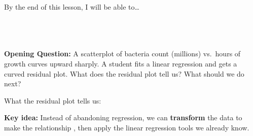 \documentclass[10pt]{article}
\begin{document}
\namedateperiod

\vspace{0.12in}

\begin{objectivebox}
\small By the end of this lesson, I will be able to\dots\\[4pt]
\writeline\\[1pt]
\writeline\\[1pt]
\writeline\\[1pt]
\writeline
\end{objectivebox}

\vspace{0.1in}

\begin{vocabbox}
\end{vocabbox}

\vspace{0.1in}

\begin{hookbox}
\small\textbf{Opening Question:} A scatterplot of bacteria count (millions) vs.\ hours of
growth curves upward sharply. A student fits a linear regression and gets a curved residual
plot. What does the residual plot tell us? What should we do next?

\vspace{6pt}
What the residual plot tells us: \blank{7cm}

\vspace{4pt}
\textbf{Key idea:} Instead of abandoning regression, we can \textbf{transform} the data to
make the relationship \blank{3cm}, then apply the linear regression tools we already know.
\end{hookbox}

\vspace{0.1in}
\end{document}
